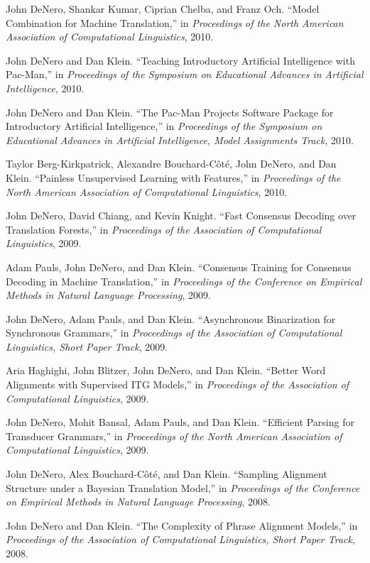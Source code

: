 \documentclass[margin,line]{res}
\begin{document}
\begin{resume}
John DeNero, Shankar Kumar, Ciprian Chelba, and Franz Och. ``Model Combination for Machine Translation,'' in {\it Proceedings of the North American Association of Computational Linguistics}, 2010. 

John DeNero and Dan Klein. ``Teaching Introductory Artificial Intelligence with Pac-Man,'' in {\it Proceedings of the Symposium on Educational Advances in Artificial Intelligence}, 2010. 

John DeNero and Dan Klein. ``The Pac-Man Projects Software Package for Introductory Artificial Intelligence,'' in {\it Proceedings of the Symposium on Educational Advances in Artificial Intelligence, Model Assignments Track}, 2010. 

Taylor Berg-Kirkpatrick, Alexandre Bouchard-Côté, John DeNero, and Dan Klein. ``Painless Unsupervised Learning with Features,'' in {\it Proceedings of the North American Association of Computational Linguistics}, 2010. 

John DeNero, David Chiang, and Kevin Knight. ``Fast Consensus Decoding over Translation Forests,'' in {\it Proceedings of the Association of Computational Linguistics}, 2009. 

Adam Pauls, John DeNero, and Dan Klein. ``Consensus Training for Consensus Decoding in Machine Translation,'' in {\it Proceedings of the Conference on Empirical Methods in Natural Language Processing}, 2009. 

John DeNero, Adam Pauls, and Dan Klein. ``Asynchronous Binarization for Synchronous Grammars,'' in {\it Proceedings of the Association of Computational Linguistics, Short Paper Track}, 2009. 

Aria Haghighi, John Blitzer, John DeNero, and Dan Klein. ``Better Word Alignments with Supervised ITG Models,'' in {\it Proceedings of the Association of Computational Linguistics}, 2009. 

John DeNero, Mohit Bansal, Adam Pauls, and Dan Klein. ``Efficient Parsing for Transducer Grammars,'' in {\it Proceedings of the North American Association of Computational Linguistics}, 2009. 

John DeNero, Alex Bouchard-Côté, and Dan Klein. ``Sampling Alignment Structure under a Bayesian Translation Model,'' in {\it Proceedings of the Conference on Empirical Methods in Natural Language Processing}, 2008. 

John DeNero and Dan Klein. ``The Complexity of Phrase Alignment Models,'' in {\it Proceedings of the Association of Computational Linguistics, Short Paper Track}, 2008. 


\end{resume}
\end{document}

